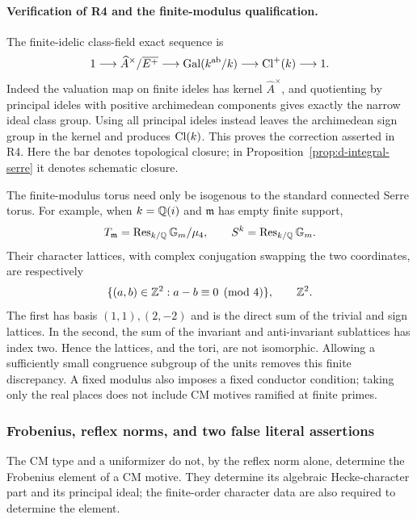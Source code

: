 \paragraph{Verification of R4 and the finite-modulus qualification.}
The finite-idelic class-field exact sequence is
\[
 1\longrightarrow\widehat A^\times/\overline{E^+}
 \longrightarrow\operatorname{Gal}(k^{\mathrm{ab}}/k)
 \longrightarrow\operatorname{Cl}^+(k)\longrightarrow1.
\]
Indeed the valuation map on finite ideles has kernel
$\widehat A^\times$, and quotienting by principal ideles with positive
archimedean components gives exactly the narrow ideal class group.
Using all principal ideles instead leaves the archimedean sign group in
the kernel and produces $\operatorname{Cl}(k)$.  This proves the correction asserted in
R4.  Here the bar denotes topological closure; in
Proposition~\ref{prop:d-integral-serre} it denotes schematic closure.

The finite-modulus torus need only be isogenous to the standard connected
Serre torus.  For example, when $k=\mathbb Q(i)$ and $\mathfrak m$ has empty
finite support,
\[
 T_{\mathfrak m}=\operatorname{Res}_{k/\mathbb Q}{\mathbb G_m}/\mu_4,
 \qquad S^k=\operatorname{Res}_{k/\mathbb Q}{\mathbb G_m}.
\]
Their character lattices, with complex conjugation swapping the two
coordinates, are respectively
\[
 \{(a,b)\in\mathbb Z^2:a-b\equiv0\pmod4\},\qquad\mathbb Z^2.
\]
The first has basis $(1,1),(2,-2)$ and is the direct sum of the trivial
and sign lattices.  In the second, the sum of the invariant and
anti-invariant sublattices has index two.  Hence the lattices, and the
tori, are not isomorphic.  Allowing a sufficiently small congruence
subgroup of the units removes this finite discrepancy.  A fixed modulus
also imposes a fixed conductor condition; taking only the real places
does not include CM motives ramified at finite primes.

\subsubsection{Frobenius, reflex norms, and two false literal assertions}

\begin{proposition}
\label{prop:d-frobenius-correction}
The CM type and a uniformizer do not, by the reflex norm alone,
determine the Frobenius element of a CM motive.  They determine its
algebraic Hecke-character part and its principal ideal; the finite-order
character data are also required to determine the element.
\end{proposition}

